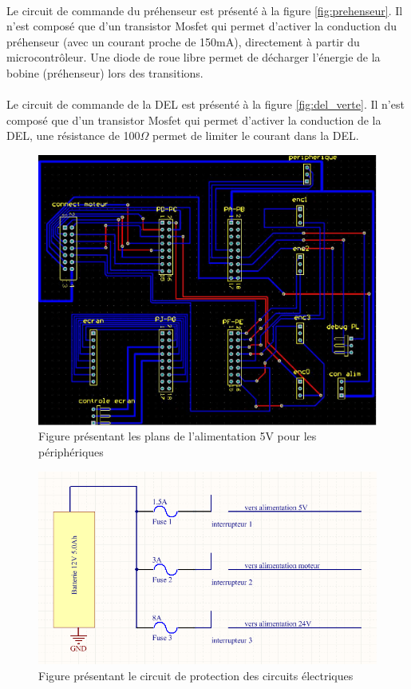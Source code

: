 \paragraph{}Le circuit de commande du préhenseur est présenté à la figure \ref{fig:prehenseur}. Il n'est composé que d'un transistor Mosfet qui permet d'activer la conduction du préhenseur (avec un courant proche de 150mA), directement à partir du microcontrôleur. Une diode de roue libre permet de décharger l'énergie de la bobine (préhenseur) lors des transitions.
\paragraph{}Le circuit de commande de la DEL est présenté à la figure \ref{fig:del_verte}. Il n'est composé que d'un transistor Mosfet qui permet d'activer la conduction de la DEL, une résistance de 100$\Omega$ permet de limiter le courant dans la DEL.

\begin{figure}
\centering
\includegraphics[scale=0.5]{fig/plan_micro.jpg}
\caption{Figure présentant les plans de l'alimentation 5V pour les périphériques}
\label{fig:plan_micro}
\end{figure}

\begin{figure}
\centering
\includegraphics[scale=0.5]{fig/plan_circuit_protection.png}
\caption{Figure présentant le circuit de protection des circuits électriques}
\label{fig:protection}
\end{figure}


